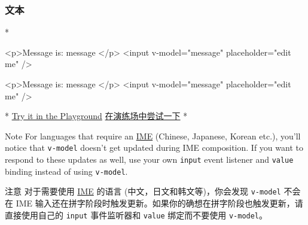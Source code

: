 \begin{paracol}{2}
\subsubsection{文本}
\switchcolumn[0]*%
\begin{codeHtml}
<p>Message is: {{ message }}</p>
<input v-model="message" placeholder="edit me" />
\end{codeHtml}
\switchcolumn
\begin{codeHtml}
<p>Message is: {{ message }}</p>
<input v-model="message" placeholder="edit me" />
\end{codeHtml}
\switchcolumn[0]*%
\href{https://play.vuejs.org/\#eNo9jUEOgyAQRa8yYUO7aNkbNOkBegM2RseWRGACoxvC3TumxuX/+f+9ql5Ez31D1SlbpuyJoSBvNLjoA6XMUCHjAg2WnAJomWoXXZxSLAwBSxk/CP2xuWl9d9GaP0YAEhgDrSOjJABLw/s8+NJBrde/NWsOpWPrI20M+yOkGdfeqXPiFAhowm9aZ8zS4+wPv/RGjtZcJtV+YpNK1g==}{Try
it in the Playground}
\switchcolumn
\href{https://play.vuejs.org/\#eNo9jUEOgyAQRa8yYUO7aNkbNOkBegM2RseWRGACoxvC3TumxuX/+f+9ql5Ez31D1SlbpuyJoSBvNLjoA6XMUCHjAg2WnAJomWoXXZxSLAwBSxk/CP2xuWl9d9GaP0YAEhgDrSOjJABLw/s8+NJBrde/NWsOpWPrI20M+yOkGdfeqXPiFAhowm9aZ8zS4+wPv/RGjtZcJtV+YpNK1g==}{在演练场中尝试一下}
\switchcolumn[0]*%
\begin{vueQuote}{Note}
For languages that require an
\href{https://en.wikipedia.org/wiki/Input_method}{IME} (Chinese,
Japanese, Korean etc.), you'll notice that \texttt{v-model} doesn't get
updated during IME composition. If you want to respond to these updates
as well, use your own \texttt{input} event listener and \texttt{value}
binding instead of using \texttt{v-model}.
\end{vueQuote}
\switchcolumn
\begin{vueQuote}{注意}
对于需要使用 \href{https://en.wikipedia.org/wiki/Input_method}{IME}
的语言 (中文，日文和韩文等)，你会发现 \texttt{v-model} 不会在 IME
输入还在拼字阶段时触发更新。如果你的确想在拼字阶段也触发更新，请直接使用自己的
\texttt{input} 事件监听器和 \texttt{value} 绑定而不要使用
\texttt{v-model}。
\end{vueQuote}
\end{paracol}

